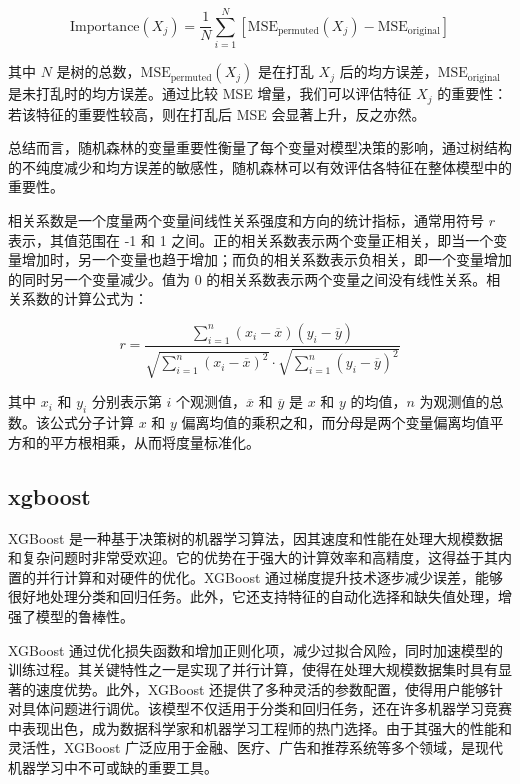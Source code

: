 \documentclass[AutoFakeBold]{LZUThesis-PgD&PhD}
\begin{document}
	\[
	\text{Importance}(X_j) = \frac{1}{N} \sum_{i=1}^{N} \left[ \text{MSE}_{\text{permuted}}(X_j) - \text{MSE}_{\text{original}} \right]
	\]
	
	其中 \( N \) 是树的总数，\( \text{MSE}_{\text{permuted}}(X_j) \) 是在打乱 \( X_j \) 后的均方误差，\( \text{MSE}_{\text{original}} \) 是未打乱时的均方误差。通过比较 MSE 增量，我们可以评估特征 \( X_j \) 的重要性：若该特征的重要性较高，则在打乱后 MSE 会显著上升，反之亦然。
	
	总结而言，随机森林的变量重要性衡量了每个变量对模型决策的影响，通过树结构的不纯度减少和均方误差的敏感性，随机森林可以有效评估各特征在整体模型中的重要性。
	
	相关系数是一个度量两个变量间线性关系强度和方向的统计指标，通常用符号 \( r \) 表示，其值范围在 -1 和 1 之间。正的相关系数表示两个变量正相关，即当一个变量增加时，另一个变量也趋于增加；而负的相关系数表示负相关，即一个变量增加的同时另一个变量减少。值为 0 的相关系数表示两个变量之间没有线性关系。相关系数的计算公式为：
	
	\[
	r = \frac{\sum_{i=1}^{n} (x_i - \overline{x})(y_i - \overline{y})}{\sqrt{\sum_{i=1}^{n} (x_i - \overline{x})^2} \cdot \sqrt{\sum_{i=1}^{n} (y_i - \overline{y})^2}}
	\]
	
	其中 \( x_i \) 和 \( y_i \) 分别表示第 \( i \) 个观测值，\( \overline{x} \) 和 \( \overline{y} \) 是 \( x \) 和 \( y \) 的均值，\( n \) 为观测值的总数。该公式分子计算 \( x \) 和 \( y \) 偏离均值的乘积之和，而分母是两个变量偏离均值平方和的平方根相乘，从而将度量标准化。
	
	

    \subsection{xgboost}
    XGBoost 是一种基于决策树的机器学习算法，因其速度和性能在处理大规模数据和复杂问题时非常受欢迎。它的优势在于强大的计算效率和高精度，这得益于其内置的并行计算和对硬件的优化。XGBoost 通过梯度提升技术逐步减少误差，能够很好地处理分类和回归任务。此外，它还支持特征的自动化选择和缺失值处理，增强了模型的鲁棒性。

    XGBoost 通过优化损失函数和增加正则化项，减少过拟合风险，同时加速模型的训练过程。其关键特性之一是实现了并行计算，使得在处理大规模数据集时具有显著的速度优势。此外，XGBoost 还提供了多种灵活的参数配置，使得用户能够针对具体问题进行调优。该模型不仅适用于分类和回归任务，还在许多机器学习竞赛中表现出色，成为数据科学家和机器学习工程师的热门选择。由于其强大的性能和灵活性，XGBoost 广泛应用于金融、医疗、广告和推荐系统等多个领域，是现代机器学习中不可或缺的重要工具。
\end{document}
